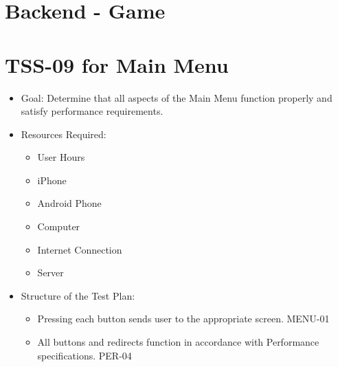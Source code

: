 \section{Backend - Game}


\section{TSS-09 for Main Menu}
\begin{itemize}
\item Goal: Determine that all aspects of the Main Menu function properly and satisfy
performance requirements.
\item Resources Required: 

\begin{itemize}
\item User Hours 
\item iPhone 
\item Android Phone 
\item Computer 
\item Internet Connection 
\item Server
\end{itemize}
\item Structure of the Test Plan: 

\begin{itemize}

\item Pressing each button sends user to the appropriate screen. MENU-01
\item All buttons and redirects function in accordance with Performance specifications. PER-04

\end{itemize}
\end{itemize}

